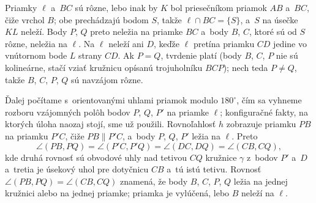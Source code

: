 {    Priamky $\ell$ a~$BC$ sú rôzne, lebo inak by $K$ bol priesečníkom priamok $AB$ a~$BC$, čiže vrchol $B$; obe prechádzajú bodom $S$, takže $\ell \cap BC = \{S\}$, a~$S$ na úsečke $KL$ neleží. Body $P$, $Q$ preto neležia na priamke $BC$ a~body $B$, $C$, ktoré sú od $S$ rôzne, neležia na $\ell$. Na $\ell$ neleží ani $D$, keďže $\ell$ pretína priamku $CD$ jedine vo vnútornom bode $L$ strany $CD$. Ak $P = Q$, tvrdenie platí (body $B$, $C$, $P$ nie sú kolineárne, stačí vziať kružnicu opísanú trojuholníku $BCP$); nech teda $P \neq Q$, takže $B$, $C$, $P$, $Q$ sú navzájom rôzne.

    Ďalej počítame s~orientovanými uhlami priamok modulo $180^\circ$, čím sa vyhneme rozboru vzájomných polôh bodov $P$, $Q$, $P'$ na priamke $\ell$; konfiguračné fakty, na ktorých úloha naozaj stojí, sme už použili. Rovnoľahlosť $h$ zobrazuje priamku $PB$ na priamku $P'C$, čiže $PB \parallel P'C$, a~body $P$, $Q$, $P'$ ležia na $\ell$. Preto
    $$
    \angle(PB, PQ) = \angle(P'C, P'Q) = \angle(DC, DQ) = \angle(CB, CQ),
    $$
    kde druhá rovnosť sú obvodové uhly nad tetivou $CQ$ kružnice $\gamma$ z~bodov $P'$ a~$D$ a~tretia je úsekový uhol pre dotyčnicu $CB$ a~tú istú tetivu. Rovnosť $\angle(PB,PQ) = \angle(CB,CQ)$ znamená, že body $B$, $C$, $P$, $Q$ ležia na jednej kružnici alebo na jednej priamke; priamka je vylúčená, lebo $B$ neleží na $\ell$.
}

